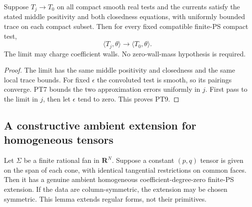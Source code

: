 \begin{theorem}
\label{thm:r13-compatible-ps-weak-continuity}
Suppose $T_j\to T_0$ on all compact smooth real tests and
the currents satisfy the stated middle positivity and both
closedness equations, with uniformly bounded trace on each
compact subset.  Then for every fixed compatible finite-PS
compact test,
\[
                     \langle T_j,\theta\rangle
                              \longrightarrow
                     \langle T_0,\theta\rangle.
 \tag{PT9}
\]
The limit may charge coefficient walls.  No zero-wall-mass
hypothesis is required.
\end{theorem}

\begin{proof}
The limit has the same middle positivity and closedness and
the same local trace bounds.  For fixed $\epsilon$ the
convoluted test is smooth, so its pairings converge.  PT7
bounds the two approximation errors uniformly in $j$.
First pass to the limit in $j$, then let $\epsilon$ tend
to zero.  This proves PT9.
\end{proof}

\subsection{A constructive ambient extension for homogeneous tensors}

\begin{lemma}
\label{lem:r13-nodal-homogeneous-form-extension}
Let $\Sigma$ be a finite rational fan in $\mathbf R^N$.
Suppose a constant $(p,q)$ tensor is given on the span of
each cone, with identical tangential restrictions on common
faces.  Then it has a genuine ambient homogeneous
coefficient-degree-zero finite-PS extension.  If the data
are column-symmetric, the extension may be chosen symmetric.
This lemma extends regular forms, not their primitives.
\end{lemma}

